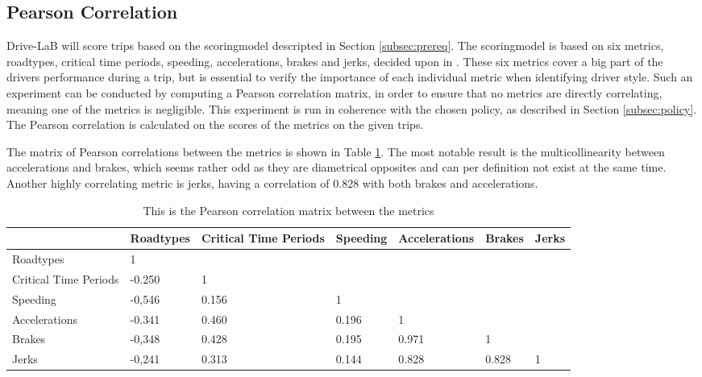 \subsection{Pearson Correlation}\label{subsec:pearsoncorrelation}

Drive-LaB will score trips based on the scoringmodel descripted in Section \ref{subsec:prereq}. The scoringmodel is based on six metrics, roadtypes, critical time periods, speeding, accelerations, brakes and jerks, decided upon in \citep{sw9_report}. These six metrics cover a big part of the drivers performance during a trip, but is essential to verify the importance of each individual metric when identifying driver style. Such an experiment can be conducted by computing a Pearson correlation matrix, in order to ensure that no metrics are directly correlating, meaning one of the metrics is negligible. This experiment is run in coherence with the chosen policy, as described in Section \ref{subsec:policy}. The Pearson correlation is calculated on the scores of the metrics on the given trips.

The matrix of Pearson correlations between the metrics is shown in Table \ref{tab:pearsonmatrix}. The most notable result is the multicollinearity between accelerations and brakes, which seems rather odd as they are diametrical opposites and can per definition not exist at the same time. Another highly correlating metric is jerks, having a correlation of 0.828 with both brakes and accelerations. 

\begin{table}[tb]
\centering
\caption{This is the Pearson correlation matrix between the metrics}
\label{tab:pearsonmatrix}
\begin{tabular}{|l|llllll|}
\hline
\rowcolor{tablegreen}
                      & \textbf{Roadtypes} & \textbf{Critical Time Periods} & \textbf{Speeding} & \textbf{Accelerations} & \textbf{Brakes} & \textbf{Jerks} \\\hline
Roadtypes             & 1 &  &  &  &  &  \\
Critical Time Periods & -0.250    & 1  &  &  &  &  \\
Speeding              & -0,546    & 0.156                 & 1  &  &  &  \\
Accelerations         & -0.341    & 0.460                 & 0.196    & 1  &  &   \\
Brakes                & -0,348    & 0.428                 & 0.195    & 0.971         & 1 &   \\
Jerks                 & -0,241    & 0.313                 & 0.144    & 0.828         & 0.828  & 1 \\\hline  
\end{tabular}
\end{table}

